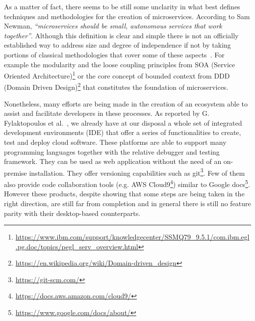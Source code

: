\documentclass[a4paper, 10pt, conference]{ieeeconf}
\begin{document}
As a matter of fact, there seems to be still some unclarity in what best defines techniques and methodologies for the creation of microservices. According to Sam Newman\cite{s-newman}, \textit{“microservices should be small, autonomous services that work together”}. Although this definition is clear and simple there is not an officially established way to address size and degree of independence if not by taking portions of classical methodologies that cover some of these aspects~\cite{overview-platforms}. For example the modularity and the loose coupling principles from SOA (Service Oriented Architecture)\footnote{\url{https://www.ibm.com/support/knowledgecenter/SSMQ79_9.5.1/com.ibm.egl.pg.doc/topics/pegl_serv_overview.html}} or the core concept of bounded context from DDD (Domain Driven Design)\footnote{\url{https://en.wikipedia.org/wiki/Domain-driven_design}} that constitutes the foundation of microservices\cite{ddd-microservices}.

Nonetheless, many efforts are being made in the creation of an ecosystem able to assist and facilitate developers in these processes. As reported by G. Fylaktopoulos et al.~\cite{overview-platforms}, we already have at our disposal a whole set of integrated development environments (IDE) that offer a series of functionalities to create, test and deploy cloud software.  These platforms are able to support many programming languages together with the relative debugger and testing framework. They can be used as web application without the need of an on-premise installation. They offer versioning capabilities such as git\footnote{\url{https://git-scm.com/}}. Few of them also provide code collaboration tools (e.g. AWS Cloud9\footnote{\url{https://docs.aws.amazon.com/cloud9/}}) similar to Google docs\footnote{\url{https://www.google.com/docs/about/}}. However these products, despite showing that some steps are being taken in the right direction, are still far from completion and in general there is still no feature parity with their desktop-based counterparts.
\end{document}
